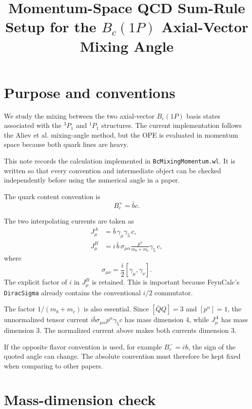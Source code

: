 \documentclass[11pt]{article}
\title{Momentum-Space QCD Sum-Rule Setup for the $B_c(1P)$ Axial-Vector Mixing Angle}
\author{}
\date{}
\begin{document}
\maketitle

\section{Purpose and conventions}

We study the mixing between the two axial-vector $B_c(1P)$ basis states
associated with the ${}^3P_1$ and ${}^1P_1$ structures.  The current
implementation follows the Aliev et al. mixing-angle method, but the OPE is
evaluated in momentum space because both quark lines are heavy.

This note records the calculation implemented in
\texttt{BcMixingMomentum.wl}.  It is written so that every convention and
intermediate object can be checked independently before using the numerical
angle in a paper.

The quark content convention is
\begin{equation}
  B_c^+ = \bar b c .
\end{equation}

The two interpolating currents are taken as
\begin{align}
  J^A_\mu &= \bar b\,\gamma_\mu\gamma_5\,c,\\
  J^B_\mu &=
  i\,\bar b\,\sigma_{\mu\alpha}
  \frac{p^\alpha}{m_b+m_c}
  \gamma_5\,c,
\end{align}
where
\begin{equation}
  \sigma_{\mu\nu}=\frac{i}{2}[\gamma_\mu,\gamma_\nu].
\end{equation}
The explicit factor of $i$ in $J^B_\mu$ is retained.  This is important
because FeynCalc's \texttt{DiracSigma} already contains the conventional
$i/2$ commutator.

The factor $1/(m_b+m_c)$ is also essential.  Since
$[\bar Q Q]=3$ and $[p^\alpha]=1$, the unnormalized tensor current
$i\bar b\sigma_{\mu\alpha}p^\alpha\gamma_5c$ has mass dimension 4, while
$J^A_\mu$ has mass dimension 3.  The normalized current above makes both
currents dimension 3.

If the opposite flavor convention is used, for example $B_c^- = \bar c b$,
the sign of the quoted angle can change.  The absolute convention must
therefore be kept fixed when comparing to other papers.

\section{Mass-dimension check}
\end{document}

